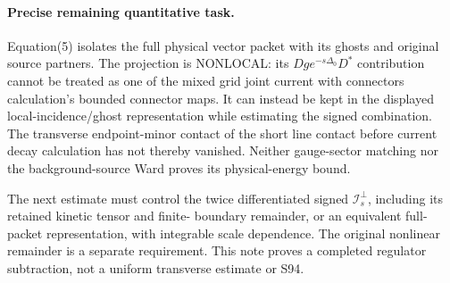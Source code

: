 \documentclass[11pt]{article}
\begin{document}
\paragraph{Precise remaining quantitative task.}
Equation(5) isolates the full physical vector packet with its ghosts
and original source partners. The projection is NONLOCAL:
its $Dg e^{-s\Delta_0}D^*$ contribution cannot be treated as one of
the mixed grid joint current with connectors calculation's bounded connector maps. It can instead be kept in the
displayed local-incidence/ghost representation while estimating the
signed combination. The transverse endpoint-minor contact of
the short line contact before current decay calculation has not thereby vanished. Neither gauge-sector matching
nor the background-source Ward proves its physical-energy bound.

The next estimate must control the twice differentiated signed
$\mathcal I_s^\perp$, including its retained kinetic tensor and finite-
boundary remainder, or an equivalent full-packet representation, with
integrable scale dependence. The original nonlinear remainder is a
separate requirement. This note proves a completed regulator subtraction,
not a uniform transverse estimate or S94.
\end{document}
